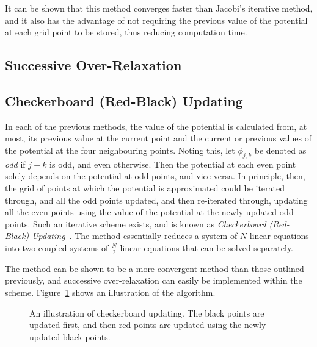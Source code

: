 \documentclass[11pt, a4paper]{article}
\begin{document}
It can be shown that this method converges faster than Jacobi's iterative
method, and it also has the advantage of not requiring the previous value of the 
potential at each grid point to be stored, thus reducing computation time.

\subsection{Successive Over-Relaxation}


\subsection{Checkerboard (Red-Black) Updating}

In each of the previous methods, the value of the potential is calculated from, at most,
its previous value at the current point and the current or previous values of the
potential at the four neighbouring points. Noting this, let $\phi_{j,k}$ be denoted as
\emph{odd} if $j+k$ is odd, and even otherwise. Then the potential at each even point
solely depends on the potential at odd points, and vice-versa. In principle, then,
the grid of points at which the potential is approximated could be iterated through,
and all the odd points updated, and then re-iterated through, updating all the
even points using the value of the potential at the newly updated odd points. Such an
iterative scheme exists, and is known as \emph{Checkerboard (Red-Black) Updating}~\cite{wallach}.
The method essentially reduces a system of $N$ linear equations into two coupled systems
of $\frac{N}{2}$ linear equations that can be solved separately.

The method can be shown to be a more convergent method than those outlined previously,
and successive over-relaxation can easily be implemented within the scheme.
Figure~\ref{fig:checker} shows an illustration of the algorithm.

\begin{figure}[h!]
\begin{center}
\end{center}
\caption{An illustration of checkerboard updating. The black points are updated first,
and then red points are updated using the newly updated black points.}
\label{fig:checker}
\end{figure}
\end{document}
